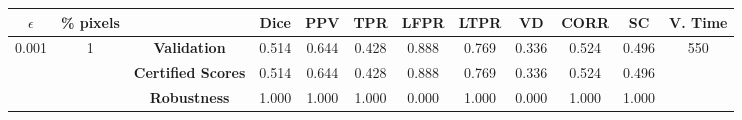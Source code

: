 \begin{longtable}{ c  c | c | c  c  c  c  c  c  c c c}
\toprule \textbf{$\epsilon$} & \textbf{\% pixels} & & \textbf{Dice} & \textbf{PPV} & \textbf{TPR} & \textbf{LFPR} & \textbf{LTPR} & \textbf{VD} & \textbf{CORR} & \textbf{SC} & \textbf{V. Time} \\
\midrule 
\multirow{3}{*}{0.001}  & \multirow{3}{*}{1} &\textbf{Validation} & 0.514 & 0.644 & 0.428 & 0.888 & 0.769 & 0.336 & 0.524 & 0.496 & \multirow{3}{*}{550} \\
 & & \textbf{Certified Scores} & 0.514 & 0.644 & 0.428 & 0.888 & 0.769 & 0.336 & 0.524 & 0.496 & \\
& & \textbf{Robustness} & 1.000 & 1.000 & 1.000 & 0.000 & 1.000 & 0.000 & 1.000 & 1.000 & \\
\end{longtable}